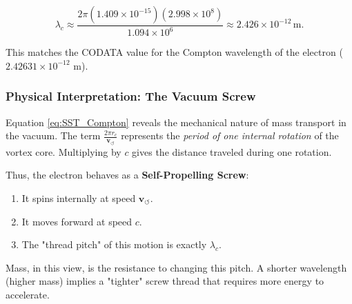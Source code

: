 \documentclass[10pt,reprint,aps,onecolumn,nofootinbib]{revtex4-2}
\begin{document}
            \begin{equation}
                \lambda_c \approx \frac{2\pi (1.409 \times 10^{-15})(2.998 \times 10^8)}{1.094 \times 10^6}
                \approx 2.426 \times 10^{-12} \, \text{m}.
            \end{equation}

            This matches the CODATA value for the Compton wavelength of the electron
            ($2.42631 \times 10^{-12}$ m).

        \subsubsection*{Physical Interpretation: The Vacuum Screw}

            Equation \eqref{eq:SST_Compton} reveals the mechanical nature of mass
            transport in the vacuum.
            The term $\frac{2\pi r_c}{\mathbf{v}_{\!\boldsymbol{\circlearrowleft}}}$ represents the \emph{period of one internal rotation}
            of the vortex core. Multiplying by $c$ gives the distance traveled
            during one rotation.

            Thus, the electron behaves as a \textbf{Self-Propelling Screw}:
            \begin{enumerate}
                \item It spins internally at speed $\mathbf{v}_{\!\boldsymbol{\circlearrowleft}}$.
                \item It moves forward at speed $c$.
                \item The "thread pitch" of this motion is exactly $\lambda_c$.
            \end{enumerate}

            Mass, in this view, is the resistance to changing this pitch. A shorter
            wavelength (higher mass) implies a "tighter" screw thread that requires
            more energy to accelerate.

\end{document}
